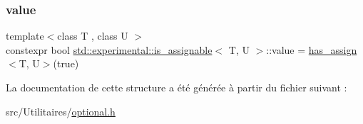\subsubsection{\texorpdfstring{value}{value}}
{\footnotesize\ttfamily template$<$class T , class U $>$ \\
constexpr bool \hyperlink{structstd_1_1experimental_1_1is__assignable}{std\+::experimental\+::is\+\_\+assignable}$<$ T, U $>$\+::value = \hyperlink{structstd_1_1experimental_1_1is__assignable_af8698cf73e8d40f6af5bafa292f9e532}{has\+\_\+assign}$<$T, U$>$(true)\hspace{0.3cm}{\ttfamily [static]}}



La documentation de cette structure a été générée à partir du fichier suivant \+:\begin{DoxyCompactItemize}
\item 
src/\+Utilitaires/\hyperlink{optional_8h}{optional.\+h}\end{DoxyCompactItemize}
